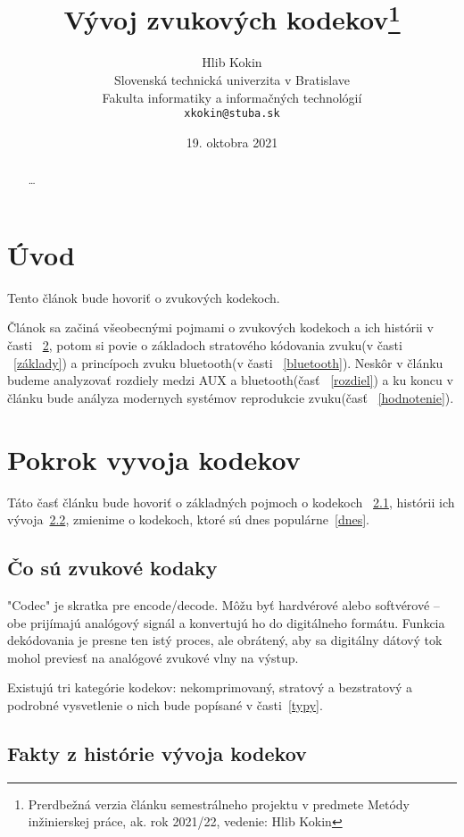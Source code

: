 \documentclass[10pt,twoside,slovak,a4paper]{article}
\title{Vývoj zvukových kodekov\thanks{Prerdbežná verzia článku semestrálneho projektu v predmete Metódy inžinierskej práce, ak. rok 2021/22, vedenie: Hlib Kokin}}
\author{Hlib Kokin\\[2pt]
	{\small Slovenská technická univerzita v Bratislave}\\
	{\small Fakulta informatiky a informačných technológií}\\
	{\small \texttt{xkokin@stuba.sk}}
	}
\date{\small 19. oktobra 2021}
\begin{document}
\maketitle

\begin{abstract}
\ldots
\end{abstract}



\section{Úvod}

Tento článok bude hovoriť o zvukových kodekoch. %

 Článok sa  začiná všeobecnými pojmami o zvukových kodekoch a ich histórii v časti ~\ref{pokrok}, potom si povie o základoch stratového kódovania zvuku(v časti ~\ref{základy}) a princípoch zvuku bluetooth(v časti ~\ref{bluetooth}). Neskôr v článku budeme analyzovať rozdiely medzi AUX a bluetooth(časť ~\ref{rozdiel}) a ku koncu v článku bude anályza modernych systémov reprodukcie zvuku(časť ~\ref{hodnotenie}). 



\section{Pokrok vyvoja kodekov} \label{pokrok}

Táto časť článku bude hovoriť o základných pojmoch o kodekoch ~\ref{čo}, histórii ich vývoja~\ref{historia}, zmienime o kodekoch, ktoré sú dnes populárne~\ref{dnes}. %

\subsection{Čo sú zvukové kodaky} \label{čo}

"Codec" je skratka pre encode/decode. Môžu byť hardvérové alebo softvérové – obe prijímajú analógový signál a konvertujú ho do digitálneho formátu. Funkcia dekódovania je presne ten istý proces, ale obrátený, aby sa digitálny dátový tok mohol previesť na analógové zvukové vlny na výstup.

Existujú tri kategórie kodekov: nekomprimovaný, stratový a bezstratový a podrobné vysvetlenie o nich bude popísané v časti~\ref{typy}.

\subsection{Fakty z histórie vývoja kodekov} \label{historia}
\end{document}
